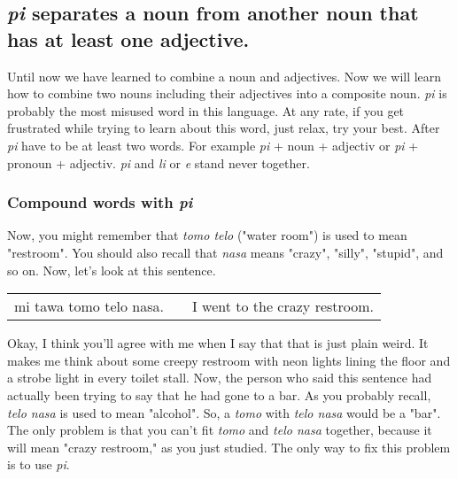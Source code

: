 \subsection*{\textit{pi} separates a noun from another noun that has at least one adjective.}

Until now we have learned to combine a noun and adjectives. 
Now we will learn how to combine two nouns including their adjectives into a composite noun. 
\textit{pi} is probably the most misused word in this language. 
At any rate, if you get frustrated while trying to learn about this word, just relax, try your best. 
After \textit{pi} have to be at least two words. 
For example \textit{pi} + noun + adjectiv or \textit{pi} + pronoun + adjectiv. 
\textit{pi} and \textit{li} or \textit{e} stand never together.
%
\subsubsection*{Compound words with \textit{pi}} 
%
Now, you might remember that \textit{tomo telo} ("water room") is used to mean "restroom". 
You should also recall that \textit{nasa} means "crazy", "silly", "stupid", and so on. 
Now, let's look at this sentence.

\begin{supertabular}{p{5,5cm}|ll}
mi tawa tomo telo nasa. && I went to the crazy restroom. \\ %
\end{supertabular}  

Okay, I think you'll agree with me when I say that that is just plain weird. 
It makes me think about some creepy restroom with neon lights lining the floor and a strobe light in every toilet stall. 
Now, the person who said this sentence had actually been trying to say that he had gone to a bar. 
As you probably recall, \textit{telo nasa} is used to mean "alcohol". 
So, a \textit{tomo} with \textit{telo nasa} would be a "bar". 
The only problem is that you can't fit \textit{tomo} and \textit{telo nasa} together, because it will mean "crazy restroom," as you just studied. 
The only way to fix this problem is to use \textit{pi}.

